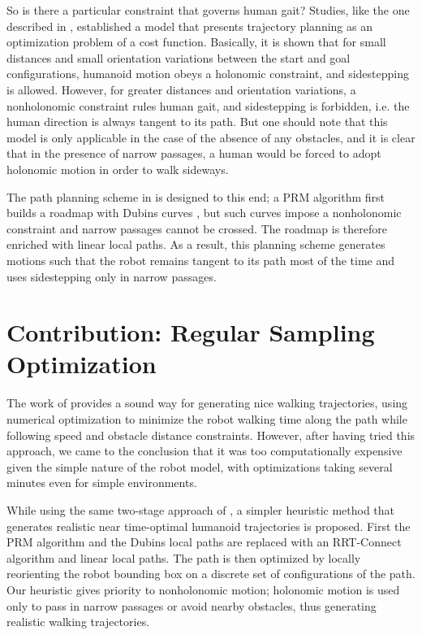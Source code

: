 So is there a particular constraint that governs human gait? Studies,
like the one described in \cite{momb10}, established a model that
presents trajectory planning as an optimization problem of a cost
function. Basically, it is shown that for small distances and small
orientation variations between the start and goal configurations,
humanoid motion obeys a holonomic constraint, and sidestepping is
allowed. However, for greater distances and orientation variations, a
nonholonomic constraint rules human gait, and sidestepping is
forbidden, i.e. the human direction is always tangent to its path.
But one should note that this model is only applicable in the case of
the absence of any obstacles, and it is clear that in the presence of
narrow passages, a human would be forced to adopt holonomic motion in
order to walk sideways.

The path planning scheme in \cite{yosh08} is designed to this end; a
PRM algorithm first builds a roadmap with Dubins curves \cite{dubi57},
but such curves impose a nonholonomic constraint and narrow passages
cannot be crossed. The roadmap is therefore enriched with linear local
paths. As a result, this planning scheme generates motions such that
the robot remains tangent to its path most of the time and uses
sidestepping only in narrow passages.

\section{Contribution: Regular Sampling Optimization}
\label{sec:chap1-contribution}

The work of \cite{moul10} provides a sound way for generating nice
walking trajectories, using numerical optimization to minimize the
robot walking time along the path while following speed and obstacle
distance constraints. However, after having tried this approach, we
came to the conclusion that it was too computationally expensive given
the simple nature of the robot model, with optimizations taking
several minutes even for simple environments.

While using the same two-stage approach of \cite{yosh08}, a simpler
heuristic method that generates realistic near time-optimal humanoid
trajectories is proposed. First the PRM algorithm and the Dubins local
paths are replaced with an RRT-Connect algorithm and linear local
paths. The path is then optimized by locally reorienting the robot
bounding box on a discrete set of configurations of the path. Our
heuristic gives priority to nonholonomic motion; holonomic motion is
used only to pass in narrow passages or avoid nearby obstacles, thus
generating realistic walking trajectories.


